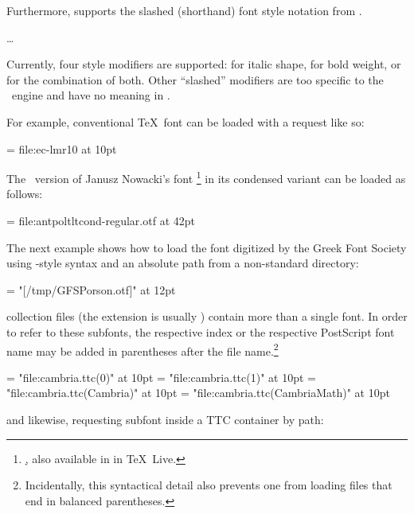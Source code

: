 Furthermore,  supports the slashed (shorthand)
font style notation from \XeTeX.

\beginnarrower
  \nonproportional{\string\font\string\fontname\space= }%
  \nonproportional{/}%
  \dots
\endnarrower

\noindent
Currently, four style modifiers are supported:
   for italic shape,
   for bold   weight,
   or  for the combination of both.
%
Other “slashed” modifiers are too specific to the \XeTeX\ engine and
have no meaning in \LuaTeX.

\endsubsection



For example, conventional \TeX\ font can be loaded with a
 request like so:

\beginlisting
  \font \lmromanten = {file:ec-lmr10} at 10pt
\endlisting

The \OpenType\ version of Janusz Nowacki’s font \footnote{%
  \hyperlink {http://jmn.pl/antykwa-poltawskiego/}, also available in
  in \TeX\ Live.
}
in its condensed variant can be loaded as follows:

\beginlisting
  \font \apcregular = file:antpoltltcond-regular.otf at 42pt
\endlisting

The next example shows how to load the  font digitized by
the Greek Font Society using \XeTeX-style syntax and an absolute path from a
non-standard directory:

\beginlisting
  \font \gfsporson = "[/tmp/GFSPorson.otf]" at 12pt
\endlisting

 collection files (the extension is usually
) contain more than a single font. In order to refer to these
subfonts, the respective index or the respective PostScript font name may be
added in parentheses after the file name.\footnote{%
  Incidentally, this syntactical detail also prevents one from loading files
  that end in balanced parentheses.
}

\beginlisting
  \font \cambriamain = "file:cambria.ttc(0)" at 10pt
  \font \cambriamath = "file:cambria.ttc(1)" at 10pt
  \font \Cambriamain = "file:cambria.ttc(Cambria)" at 10pt
  \font \Cambriamath = "file:cambria.ttc(CambriaMath)" at 10pt
\endlisting

and likewise, requesting subfont inside a TTC container by path:

